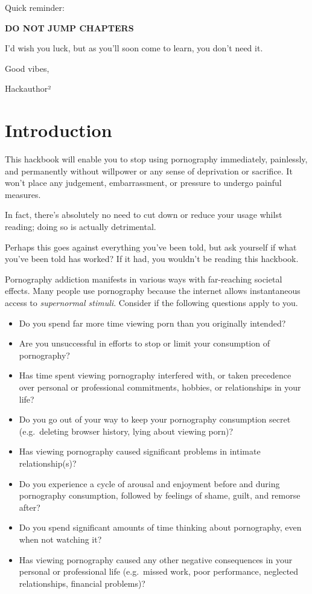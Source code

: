 \documentclass[
]{book}
\begin{document}
Quick reminder:

{\textbf{DO NOT JUMP CHAPTERS}}

I'd wish you luck, but as you'll soon come to learn, you don't need it.

Good vibes,

Hackauthor²

\hypertarget{introduction}{%
\chapter{Introduction}\label{introduction}}

This hackbook will enable you to stop using pornography immediately, painlessly, and permanently without willpower or any sense of deprivation or sacrifice. It won't place any judgement, embarrassment, or pressure to undergo painful measures.

In fact, there's absolutely no need to cut down or reduce your usage whilst reading; doing so is actually detrimental.

Perhaps this goes against everything you've been told, but ask yourself if what you've been told has worked? If it had, you wouldn't be reading this hackbook.

Pornography addiction manifests in various ways with far-reaching societal effects. Many people use pornography because the internet allows instantaneous access to \emph{supernormal stimuli}. Consider if the following questions apply to you.

\begin{itemize}
\item
  Do you spend far more time viewing porn than you originally intended?
\item
  Are you unsuccessful in efforts to stop or limit your consumption of pornography?
\item
  Has time spent viewing pornography interfered with, or taken precedence over personal or professional commitments, hobbies, or relationships in your life?
\item
  Do you go out of your way to keep your pornography consumption secret (e.g.~deleting browser history, lying about viewing porn)?
\item
  Has viewing pornography caused significant problems in intimate relationship(s)?
\item
  Do you experience a cycle of arousal and enjoyment before and during pornography consumption, followed by feelings of shame, guilt, and remorse after?
\item
  Do you spend significant amounts of time thinking about pornography, even when not watching it?
\item
  Has viewing pornography caused any other negative consequences in your personal or professional life (e.g.~missed work, poor performance, neglected relationships, financial problems)?
\end{itemize}
\end{document}
